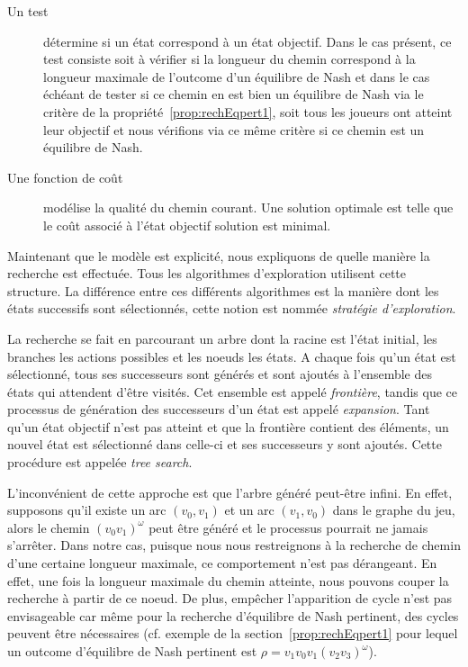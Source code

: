 \begin{description}
	\item[Un test] détermine si un état correspond à un état objectif. Dans le cas présent, ce test consiste soit à vérifier si la longueur du chemin correspond à la longueur maximale de l'outcome d'un équilibre de Nash et dans le cas échéant de tester si ce chemin en est bien un équilibre de Nash via le critère de la propriété~\ref{prop:rechEqpert1}, soit tous les joueurs ont atteint leur objectif et nous vérifions via ce même critère si ce chemin est un équilibre de Nash.
	
	\item[Une fonction de coût] modélise la qualité du chemin courant. Une solution optimale est telle que le coût associé à l'état objectif solution est minimal.
\end{description}

Maintenant que le modèle est explicité, nous expliquons de quelle manière la recherche est effectuée. Tous les algorithmes d'exploration utilisent cette structure. La différence entre ces différents algorithmes est la manière dont les états successifs sont sélectionnés, cette notion est nommée \emph{stratégie d'exploration}.

La recherche se fait en parcourant un arbre dont la racine est l'état initial, les branches les actions possibles et les noeuds les états. A chaque fois qu'un état est sélectionné, tous ses successeurs sont générés et sont ajoutés à l'ensemble des états qui attendent d'être visités. Cet ensemble est appelé \emph{frontière}, tandis que ce processus de génération des successeurs d'un état est appelé \emph{expansion}. Tant qu'un état objectif n'est pas atteint et que la frontière contient des éléments, un nouvel état est sélectionné dans celle-ci et ses successeurs y sont ajoutés. Cette procédure est appelée \emph{tree search}.

L'inconvénient de cette approche est que l'arbre généré peut-être infini. En effet, supposons qu'il existe un arc $(v_0, v_1)$ et un arc $(v_1, v_0)$ dans le graphe du jeu, alors le chemin $ (v_0v_1)^{\omega}$ peut être généré et le processus pourrait ne jamais s'arrêter. Dans notre cas, puisque nous nous restreignons à la recherche de chemin d'une certaine longueur maximale, ce comportement n'est pas dérangeant. En effet, une fois la longueur maximale du chemin atteinte, nous pouvons couper la recherche à partir de ce noeud. De plus, empêcher l'apparition de cycle n'est pas envisageable car même pour la recherche d'équilibre de Nash pertinent, des cycles peuvent être nécessaires (cf. exemple de la section~\ref{prop:rechEqpert1} pour lequel un outcome  d'équilibre de Nash pertinent est $\rho = v_{1}v_{0}v_{1}(v_{2}v_{3})^{\omega} $).\\


